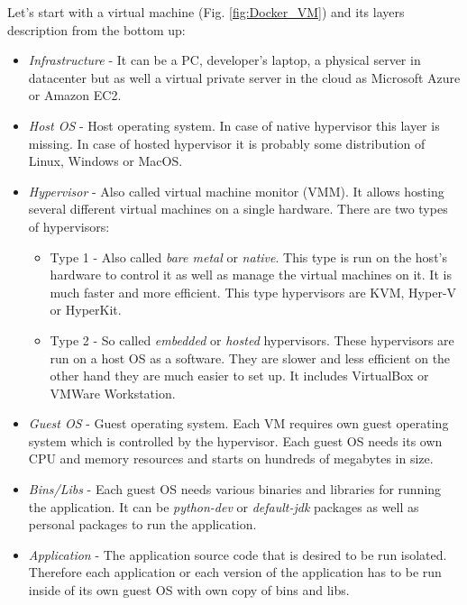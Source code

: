 \documentclass[12pt,a4paper]{article}
\begin{document}
\noindent
Let's start with a virtual machine (Fig. \ref{fig:Docker_VM}) and its layers description from the bottom up:
\begin{itemize}
\item \textit{Infrastructure} - It can be a PC, developer's laptop, a physical server in datacenter but as well a virtual private
server in the cloud as Microsoft Azure or Amazon EC2.
\item \textit{Host OS} - Host operating system. In case of native hypervisor this layer is missing. In case of hosted hypervisor
it is probably some distribution of Linux, Windows or MacOS.
\item \textit{Hypervisor} - Also called virtual machine monitor (VMM). It allows hosting several different virtual machines
on a single hardware. There are two types of hypervisors:
\begin{itemize}
\item Type 1 -  Also called \textit{bare metal} or \textit{native}. This type is run on the host's hardware to control it as well as manage 
the virtual machines on it. It is much faster and more efficient. This type hypervisors are KVM, Hyper-V or HyperKit.
\item Type 2 - So called \textit{embedded} or \textit{hosted} hypervisors. These hypervisors are run on a host OS as a software. They are slower
and less efficient on the other hand they are much easier to set up. It includes VirtualBox or VMWare Workstation.
\end{itemize}
\item \textit{Guest OS} - Guest operating system. Each VM requires own guest operating system which is controlled by the hypervisor. Each 
guest OS needs its own CPU and memory resources and starts on hundreds of megabytes in size.
\item \textit{Bins/Libs} - Each guest OS needs various binaries and libraries for running the application. It can be \textit{python-dev} or \textit{default-jdk} packages as well as personal packages to run the application.
\item \textit{Application} - The application source code that is desired to be run isolated. Therefore each application or each version of the application has to be run inside of its own guest OS with own copy of bins and libs. 
\end{itemize}
\end{document}
